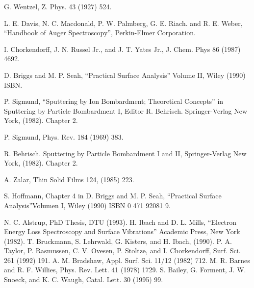 \documentclass[12pt]{book}
\begin{document}
\begin{thebibliography}{99}
          G. Wentzel, Z. Phys. 43 (1927) 524.

               L.  E.  Davis,   N.   C.   Macdonald,
          P. W. Palmberg, G. E. Riach. and R. E. Weber, ``Handbook  of
          Auger Spectroscopy'', Perkin-Elmer Corporation.

              I.  Chorkendorff,  J.  N.  Russel
          Jr., and J. T. Yates Jr., J. Chem. Phys 86 (1987) 4692.

              D. Briggs and M. P. Seah, ``Practical
          Surface Analysis'' Volume II, Wiley (1990) ISBN.




            P.  Sigmund,   ``Sputtering   by   Ion
          Bombardment;  Theoretical  Concepts''   in   Sputtering   by
          Particle Bombardment I, Editor R. Behrisch.  Springer-Verlag
          New York, (1982). Chapter 2.

           P. Sigmund, Phys. Rev. 184 (1969) 383.

                       R. Behrisch.  Sputtering   by
          Particle Bombardment I and  II,  Springer-Verlag  New  York,
          (1982). Chapter 2.

           A. Zalar, Thin Solid Films 124, (1985) 223.

           S. Hoffmann, Chapter 4 in D. Briggs and M.
          P.  Seah,  ``Practical  Surface  Analysis''Volumen  I,  Wiley
          (1990) ISBN 0 471 92081 9.

           N. C. Alstrup, PhD Thesis, DTU (1993).
  H. Ibach and D. L. Mills, ``Electron Energy Loss Spectroscopy and Surface Vibrations'' Academic Press, New York (1982).
 T. Bruckmann, S. Lehrwald, G. Kisters, and H. Ibach, (1990).
 P. A. Taylor, P. Rasmussen, C. V. Ovesen, P. Stoltze, and I. Chorkendorff, Surf. Sci. 261 (1992) 191.
 A. M. Bradshaw, Appl. Surf. Sci. 11/12 (1982) 712.
 M. R. Barnes and R. F. Willies, Phys. Rev. Lett. 41 (1978) 1729.
  S. Bailey, G. Forment, J. W. Snoeck, and K. C. Waugh, Catal. Lett. 30 (1995) 99.




\end{thebibliography}
\end{document}
